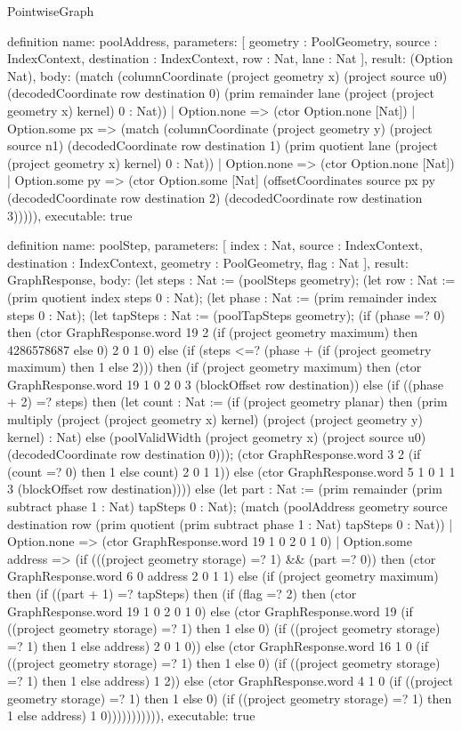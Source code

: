 \begin{lexlean}{PointwiseGraph}
\begin{semanticmodule}
definition{
  name: poolAddress,
  parameters: [
    geometry : PoolGeometry,
    source : IndexContext,
    destination : IndexContext,
    row : Nat,
    lane : Nat
  ],
  result: (Option Nat),
  body: (match (columnCoordinate (project geometry x) (project source u0) (decodedCoordinate row destination 0) (prim remainder lane (project (project geometry x) kernel) 0 : Nat))
    | Option.none => (ctor Option.none [Nat])
    | Option.some px => (match (columnCoordinate (project geometry y) (project source n1) (decodedCoordinate row destination 1) (prim quotient lane (project (project geometry x) kernel) 0 : Nat))
      | Option.none => (ctor Option.none [Nat])
      | Option.some py => (ctor Option.some [Nat] (offsetCoordinates source px py (decodedCoordinate row destination 2) (decodedCoordinate row destination 3))))),
  executable: true
}

definition{
  name: poolStep,
  parameters: [
    index : Nat,
    source : IndexContext,
    destination : IndexContext,
    geometry : PoolGeometry,
    flag : Nat
  ],
  result: GraphResponse,
  body: (let steps : Nat := (poolSteps geometry); (let row : Nat := (prim quotient index steps 0 : Nat); (let phase : Nat := (prim remainder index steps 0 : Nat); (let tapSteps : Nat := (poolTapSteps geometry); (if (phase =? 0) then (ctor GraphResponse.word 19 2 (if (project geometry maximum) then 4286578687 else 0) 2 0 1 0) else (if (steps <=? (phase + (if (project geometry maximum) then 1 else 2))) then (if (project geometry maximum) then (ctor GraphResponse.word 19 1 0 2 0 3 (blockOffset row destination)) else (if ((phase + 2) =? steps) then (let count : Nat := (if (project geometry planar) then (prim multiply (project (project geometry x) kernel) (project (project geometry y) kernel) : Nat) else (poolValidWidth (project geometry x) (project source u0) (decodedCoordinate row destination 0))); (ctor GraphResponse.word 3 2 (if (count =? 0) then 1 else count) 2 0 1 1)) else (ctor GraphResponse.word 5 1 0 1 1 3 (blockOffset row destination)))) else (let part : Nat := (prim remainder (prim subtract phase 1 : Nat) tapSteps 0 : Nat); (match (poolAddress geometry source destination row (prim quotient (prim subtract phase 1 : Nat) tapSteps 0 : Nat))
    | Option.none => (ctor GraphResponse.word 19 1 0 2 0 1 0)
    | Option.some address => (if (((project geometry storage) =? 1) && (part =? 0)) then (ctor GraphResponse.word 6 0 address 2 0 1 1) else (if (project geometry maximum) then (if ((part + 1) =? tapSteps) then (if (flag =? 2) then (ctor GraphResponse.word 19 1 0 2 0 1 0) else (ctor GraphResponse.word 19 (if ((project geometry storage) =? 1) then 1 else 0) (if ((project geometry storage) =? 1) then 1 else address) 2 0 1 0)) else (ctor GraphResponse.word 16 1 0 (if ((project geometry storage) =? 1) then 1 else 0) (if ((project geometry storage) =? 1) then 1 else address) 1 2)) else (ctor GraphResponse.word 4 1 0 (if ((project geometry storage) =? 1) then 1 else 0) (if ((project geometry storage) =? 1) then 1 else address) 1 0))))))))))),
  executable: true
}


\end{semanticmodule}
\end{lexlean}
